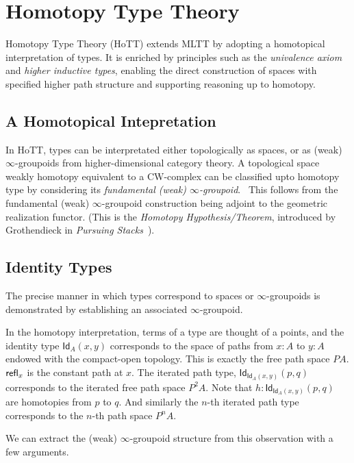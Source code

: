 \section{Homotopy Type Theory}

Homotopy Type Theory (HoTT) extends MLTT by adopting a homotopical interpretation
of types.
It is enriched by principles such as the \emph{univalence axiom} and \emph{higher inductive types}, 
enabling the direct construction of spaces with specified higher path structure and supporting reasoning up to homotopy.~\cite{HoTT}

\subsection{A Homotopical Intepretation}
In HoTT, types can be interpretated either topologically as spaces, 
or as (weak) $\infty$-groupoids from higher-dimensional category theory.
A topological space weakly homotopy equivalent to a CW-complex can be classified upto homotopy type by considering its \textit{fundamental
(weak) $\infty$-groupoid}.~\cite{lurie, quillen2006homotopical} This follows from the fundamental (weak) $\infty$-groupoid construction being adjoint 
to the geometric realization functor. (This is the \textit{Homotopy Hypothesis/Theorem}, introduced by Grothendieck in \emph{Pursuing Stacks}~\cite{grothstacks}).

\subsection{Identity Types}
The precise manner in which types correspond to spaces or $\infty$-groupoids is demonstrated by
establishing an associated $\infty$-groupoid.

In the homotopy interpretation, terms of a type are thought of a points, and the identity type $\mathsf{Id}_A(x,y)$ corresponds to the space of 
paths from $x : A$ to $y : A$ endowed with the compact-open topology. This is exactly the free path space $PA$. $\mathsf{refl}_x$ is the
constant path at $x$.
The iterated path type, $\mathsf{Id}_{\mathsf{Id}_A(x,y)}(p,q)$ corresponds to the iterated free path space $P^2 A$.
Note that $h : \mathsf{Id}_{\mathsf{Id}_A(x,y)}(p,q)$ are homotopies from $p$ to $q$.
And similarly the $n$-th iterated path type corresponds to the $n$-th path space $P^n A$. 

We can extract the (weak) $\infty$-groupoid structure from this observation with a few arguments.

